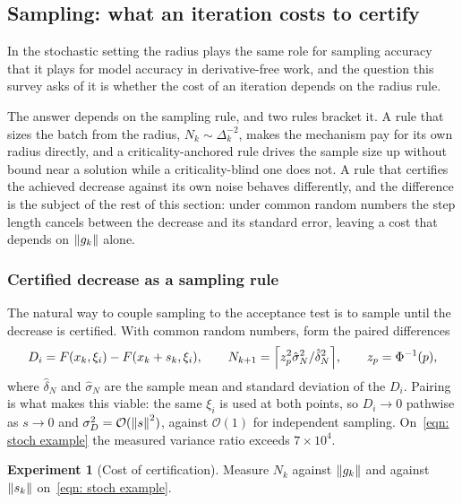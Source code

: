 \documentclass[11pt]{article}
\theoremstyle{plain}
\theoremstyle{definition}
\newtheorem{experiment}{Experiment}
\theoremstyle{remark}
\numberwithin{equation}{section}
\providecommand{\calO}{\mathcal{O}}
\begin{document}
\subsection{Sampling: what an iteration costs to certify}
\label{sec: res stochastic}

In the stochastic setting the radius plays the same role for sampling accuracy
that it plays for model accuracy in derivative-free work, and the question this
survey asks of it is whether the cost of an iteration depends on the radius rule.

The answer depends on the sampling rule, and two rules bracket it. A rule that
sizes the batch from the radius, $N_k \sim \Delta_k^{-2}$, makes the mechanism
pay for its own radius directly, and a criticality-anchored rule drives the
sample size up without bound near a solution while a criticality-blind one does
not. A rule that certifies the achieved decrease against its own noise behaves
differently, and the difference is the subject of the rest of this section: under
common random numbers the step length cancels between the decrease and its
standard error, leaving a cost that depends on $\left \lVert g_k \right \rVert$ alone.

\subsubsection{Certified decrease as a sampling rule}

The natural way to couple sampling to the acceptance test is to sample until the decrease is
certified. With common random numbers, form the paired differences
\begin{equation}
  D_i = F(x_k, \xi_i) - F(x_k + s_k, \xi_i) ,
  \qquad
  N_{k+1} = \Bigl\lceil z_p^2 \hat\sigma_N^2 / \hat\delta_N^2 \Bigr\rceil ,
  \qquad z_p = \Phi^{-1}(p) ,
  \label{eqn: certified rule}
\end{equation}
where $\hat\delta_N$ and $\hat\sigma_N$ are the sample mean and standard deviation of the $D_i$.
Pairing is what makes this viable: the same $\xi_i$ is used at both points, so $D_i \to 0$
pathwise as $s \to 0$ and $\sigma_D^2 = \calO(\norm{s}^2)$, against $\calO(1)$ for independent
sampling. On~\eqref{eqn: stoch example} the measured variance ratio exceeds $7 \times 10^4$.

\begin{experiment}[Cost of certification]
\label{exp: certification cost}
  Measure $N_k$ against $\left \lVert g_k \right \rVert$ and against $\left \lVert s_k \right \rVert$ on~\eqref{eqn: stoch example}.
\end{experiment}
\end{document}
